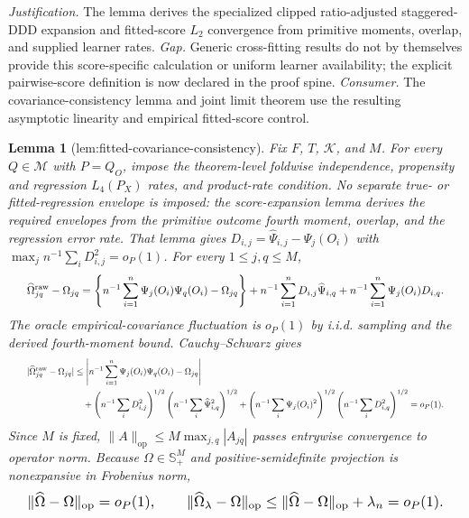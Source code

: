 \documentclass{article}
\newtheorem{lemma}{Lemma}
\begin{document}
\par\smallskip\noindent \textit{Justification.} The lemma derives the specialized clipped ratio-adjusted staggered-DDD expansion and fitted-score \(L_2\) convergence from primitive moments, overlap, and supplied learner rates. \textit{Gap.} Generic cross-fitting results do not by themselves provide this score-specific calculation or uniform learner availability; the explicit pairwise-score definition is now declared in the proof spine. \textit{Consumer.} The covariance-consistency lemma and joint limit theorem use the resulting asymptotic linearity and empirical fitted-score control.

\begin{lemma}[lem:fitted-covariance-consistency]\label{lem:fitted-covariance-consistency}
Fix \(F\), \(T\), \(\mathcal K\), and \(M\). For every \(Q\in\mathcal M\) with \(P=Q_O\), impose the theorem-level foldwise independence, propensity and regression \(L_4(P_X)\) rates, and product-rate condition. No separate true- or fitted-regression envelope is imposed: the score-expansion lemma derives the required envelopes from the primitive outcome fourth moment, overlap, and the regression error rate. That lemma gives \(D_{i,j}=\widehat\Psi_{i,j}-\Psi_j(O_i)\) with \(\max_j n^{-1}\sum_iD_{i,j}^2=o_P(1)\). For every \(1\le j,q\le M\), \[
\makebox[\linewidth][c]{\resizebox{0.98\linewidth}{!}{\leavevmode\par\noindent \makebox[\linewidth][c]{\resizebox{0.98\linewidth}{!}{\(\displaystyle \displaystyle \widehat\Omega^{\mathrm{raw}}_{jq}-\Omega_{jq}=\left\{n^{-1}\sum_{i=1}^n\Psi_j(O_i)\Psi_q(O_i)-\Omega_{jq}\right\}+n^{-1}\sum_{i=1}^nD_{i,j}\widehat\Psi_{i,q}+n^{-1}\sum_{i=1}^n\Psi_j(O_i)D_{i,q}.\)}}\par\noindent}}
\] The oracle empirical-covariance fluctuation is \(o_P(1)\) by i.i.d. sampling and the derived fourth-moment bound. Cauchy--Schwarz gives \[
\makebox[\linewidth][c]{\resizebox{0.98\linewidth}{!}{\leavevmode\par\noindent \makebox[\linewidth][c]{\resizebox{0.98\linewidth}{!}{\(\displaystyle \displaystyle \begin{aligned}|\widehat\Omega^{\mathrm{raw}}_{jq}-\Omega_{jq}|&\le\left|n^{-1}\sum_{i=1}^n\Psi_j(O_i)\Psi_q(O_i)-\Omega_{jq}\right|\\&\quad+\left(n^{-1}\sum_iD_{i,j}^2\right)^{1/2}\left(n^{-1}\sum_i\widehat\Psi_{i,q}^2\right)^{1/2}+\left(n^{-1}\sum_i\Psi_j(O_i)^2\right)^{1/2}\left(n^{-1}\sum_iD_{i,q}^2\right)^{1/2}=o_P(1).\end{aligned}\)}}\par\noindent}}
\] Since \(M\) is fixed, \(\|A\|_{\mathrm{op}}\le M\max_{j,q}|A_{jq}|\) passes entrywise convergence to operator norm. Because \(\Omega\in\mathbb S_+^M\) and positive-semidefinite projection is nonexpansive in Frobenius norm, \[
\makebox[\linewidth][c]{\resizebox{0.98\linewidth}{!}{\leavevmode\par\noindent \makebox[\linewidth][c]{\resizebox{0.98\linewidth}{!}{\(\displaystyle \displaystyle \|\widehat\Omega-\Omega\|_{\mathrm{op}}=o_P(1),\qquad \|\widehat\Omega_\lambda-\Omega\|_{\mathrm{op}}\le\|\widehat\Omega-\Omega\|_{\mathrm{op}}+\lambda_n=o_P(1).\)}}\par\noindent}}
\]
\end{lemma}
\end{document}
